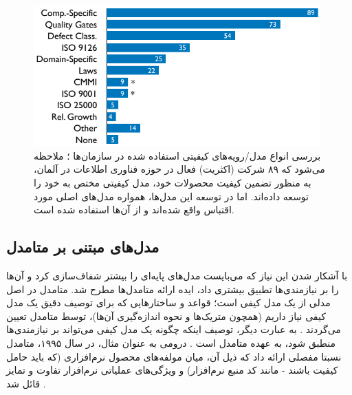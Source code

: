 \begin{figure}[H]
	\centering\includegraphics[width=11cm]{Resources/wagner.PNG}
	\caption[بررسی انواع مدل‌ها/رویه‌های کیفیتی استفاده شده در سازمان‌ها]
	{بررسی انواع مدل/رویه‌های کیفیتی استفاده شده در سازمان‌ها
		\cite{wagner_software_2012}؛
		ملاحظه می‌شود که ۸۹ شرکت (اکثریت) فعال در حوزه فناوری اطلاعات در آلمان، به منظور تضمین کیفیت محصولات خود، مدل کیفیتی مختص به خود را توسعه داده‌اند. اما در توسعه این مدل‌ها، همواره مدل‌های اصلی مورد اقتباس واقع شده‌اند و از آن‌ها استفاده شده است.
	}
	\label{fig:wagner}
\end{figure}
\subsection{مدل‌های مبتنی بر متامدل}
با آشکار شدن این نیاز که می‌بایست مدل‌های پایه‌ای را بیشتر شفاف‌سازی کرد و آن‌ها را بر نیازمندی‌ها تطبیق بیشتری داد، ایده ارائه متامدل‌ها مطرح شد. متامدل در اصل مدلی از یک مدل کیفی است؛ قواعد و ساختارهایی که برای توصیف دقیق یک مدل کیفی نیاز داریم (همچون متریک‌ها و نحوه اندازه‌گیری آن‌ها)، توسط متامدل تعیین می‌گردند
\cite{deissenboeck_software_2009}.
به عبارت دیگر، توصیف اینکه چگونه یک مدل کیفی می‌تواند بر نیازمندی‌ها منطبق شود، به عهده متامدل است
\cite{wagner_software_2013}.
درومی به عنوان مثال، در سال ۱۹۹۵، متامدل نسبتا مفصلی ارائه داد که ذیل آن، میان مولفه‌های محصول نرم‌افزاری (که باید حامل کیفیت باشند - مانند کد منبع نرم‌افزار) و ویژگی‌های عملیاتی نرم‌افزار تفاوت و تمایز قائل شد
\cite{dromey_model_1995}.
